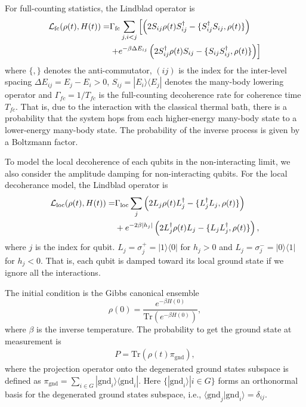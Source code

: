 \documentclass[prd,twocolumn,tightenlines,preprintnumbers,showpacs,superscriptaddress,notitlepage,nofootinbib,eqsecnum,floatfix,longbibliography,aps,10pt]{revtex4-1}
\begin{document}
For full-counting statistics, the Lindblad operator is
\begin{align}
\mathcal{L}_{\textrm{fc}}(\rho (t), H(t)) = & \Gamma_{\textrm{fc}} \sum_{j, i<j} \left[  \left(2 S_{ij} \rho(t) S_{ij}^\dagger - \{ S^\dagger_{ij} S_{ij}, \rho(t) \}\right) \notag \right.
\\
& \left. + e^{-\beta \Delta E_{ij}} \left(2 S_{ij}^\dagger \rho(t) S_{ij} - \{ S_{ij} S^\dagger_{ij}, \rho(t) \} \right)\right]
\end{align}
where $\{, \}$ denotes the anti-commutator, $(ij)$ is the index for the inter-level spacing $\Delta E_{ij}=E_j-E_i>0$,  $S_{ij}=|E_i \rangle \langle E_j|$ denotes the many-body lowering operator and $\Gamma_{fc} = 1/T_{fc}$ is the full-counting decoherence rate for coherence time $T_{fc}$.
That is, due to the interaction with the classical thermal bath, there is a probability that the system hops from each higher-energy many-body state to a lower-energy many-body state.
The probability of the inverse process is given by a Boltzmann factor.

To model the local decoherence of each qubits in the non-interacting limit, we also consider the amplitude damping for non-interacting qubits.
For the local decoherance model, the Lindblad operator is
\begin{align}
\mathcal{L}_{\textrm{loc}}(\rho (t), H(t)) = &  \Gamma_{\textrm{loc}} \sum_j \left(2L_j \rho(t) L_j^\dagger - \{ L^\dagger_j L_j, \rho(t) \} \right)\notag \\
& + e^{- 2 \beta |h_j| }  \left(2L_j^\dagger \rho(t) L_j - \{ L_j L_j^\dagger, \rho(t) \} \right) ,
\end{align}
where $j$ is the index for qubit.
$L_j= \sigma^{+}_j=|1\rangle \langle 0|$ for $h_j>0$ and $L_j= \sigma^{-}_j=|0\rangle \langle 1|$ for $h_j<0$.
That is, each qubit is damped toward its local ground state if we ignore all the interactions.

The initial condition is the Gibbs canonical ensemble
\begin{equation}
\rho (0) =  \frac{e^{-\beta H(0)}}{\mbox{Tr}\left(e^{-\beta H(0)}\right)} ,
\end{equation}
where $\beta$ is the inverse temperature.
The probability to get the ground state at measurement is
\begin{align}
P =  \mbox{Tr} \left( \rho (t) \pi_{\mbox{gnd}} \right)  ,
\end{align}
where the projection operator onto the degenerated ground states subspace is defined as $\pi_{\mbox{gnd}}=\sum_{i\in G} |\mbox{gnd}_i\rangle \langle \mbox{gnd}_i| $.
Here $\{ | \mbox{gnd}_i \rangle | i \in G \}$ forms an orthonormal basis for the degenerated ground states subspace, i.e., $\langle \mbox{gnd}_j | \mbox{gnd}_i \rangle = \delta_{ij}$.
\end{document}
